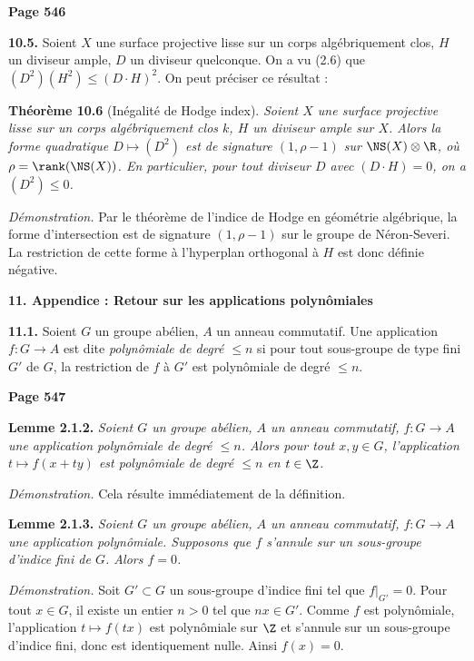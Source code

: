 \newpage
\noindent\textbf{Page 546}

\smallskip
\noindent\textbf{10.5.} Soient $X$ une surface projective lisse sur un corps alg\'ebriquement clos, $H$ un diviseur ample, $D$ un diviseur quelconque. On a vu (2.6) que $(D^2)(H^2) \leq (D \cdot H)^2$. On peut pr\'eciser ce r\'esultat :

\smallskip
\noindent\textbf{Th\'eor\`eme 10.6} (In\'egalit\'e de Hodge index). \textit{Soient $X$ une surface projective lisse sur un corps alg\'ebriquement clos $k$, $H$ un diviseur ample sur $X$. Alors la forme quadratique $D \mapsto (D^2)$ est de signature $(1, \rho-1)$ sur $\NS(X) \otimes \R$, o\`u $\rho = \rank(\NS(X))$. En particulier, pour tout diviseur $D$ avec $(D \cdot H) = 0$, on a $(D^2) \leq 0$.}

\textit{D\'emonstration.} Par le th\'eor\`eme de l'indice de Hodge en g\'eom\'etrie alg\'ebrique, la forme d'intersection est de signature $(1, \rho-1)$ sur le groupe de N\'eron-Severi. La restriction de cette forme \`a l'hyperplan orthogonal \`a $H$ est donc d\'efinie n\'egative.

\medskip
\noindent\textbf{11. Appendice : Retour sur les applications polyn\^omiales}

\smallskip
\noindent\textbf{11.1.} Soient $G$ un groupe ab\'elien, $A$ un anneau commutatif. Une application $f : G \longrightarrow A$ est dite \textit{polyn\^omiale de degr\'e $\leq n$} si pour tout sous-groupe de type fini $G'$ de $G$, la restriction de $f$ \`a $G'$ est polyn\^omiale de degr\'e $\leq n$.

\newpage
\noindent\textbf{Page 547}

\smallskip
\noindent\textbf{Lemme 2.1.2.} \textit{Soient $G$ un groupe ab\'elien, $A$ un anneau commutatif, $f : G \longrightarrow A$ une application polyn\^omiale de degr\'e $\leq n$. Alors pour tout $x, y \in G$, l'application $t \mapsto f(x + ty)$ est polyn\^omiale de degr\'e $\leq n$ en $t \in \Z$.}

\textit{D\'emonstration.} Cela r\'esulte imm\'ediatement de la d\'efinition.

\smallskip
\noindent\textbf{Lemme 2.1.3.} \textit{Soient $G$ un groupe ab\'elien, $A$ un anneau commutatif, $f : G \longrightarrow A$ une application polyn\^omiale. Supposons que $f$ s'annule sur un sous-groupe d'indice fini de $G$. Alors $f = 0$.}

\textit{D\'emonstration.} Soit $G' \subset G$ un sous-groupe d'indice fini tel que $f|_{G'} = 0$. Pour tout $x \in G$, il existe un entier $n > 0$ tel que $nx \in G'$. Comme $f$ est polyn\^omiale, l'application $t \mapsto f(tx)$ est polyn\^omiale sur $\Z$ et s'annule sur un sous-groupe d'indice fini, donc est identiquement nulle. Ainsi $f(x) = 0$.

